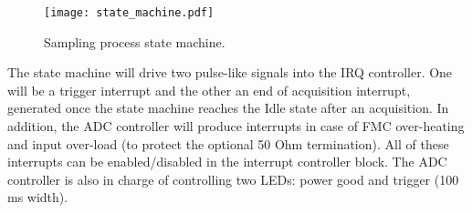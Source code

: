 \documentclass{article}
\begin{document}
\begin{figure}[htbp]
  \centering
  \texttt{[image: state\_machine.pdf]}
  \caption{Sampling process state machine.}
  \label{fig:state_machine}
\end{figure}

The state machine will drive two pulse-like signals into the IRQ controller. One will be a trigger interrupt and the other an end of acquisition interrupt, generated once the state machine reaches the Idle state after an acquisition. In addition, the ADC controller will produce interrupts in case of FMC over-heating and input over-load (to protect the optional 50 Ohm termination). All of these interrupts can be enabled/disabled in the interrupt controller block. The ADC controller is also in charge of controlling two LEDs: power good and trigger (100 ms width).
\end{document}
